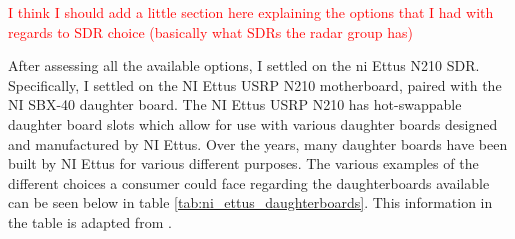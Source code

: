 \documentclass[11pt]{report}
\begin{document}
\textcolor{red}{I think I should add a little section here explaining the options that I had with regards to SDR choice (basically what SDRs the radar group has)}

After assessing all the available options, I settled on the \gls{ni} Ettus N210 SDR. Specifically, I settled on the NI Ettus USRP N210 motherboard, paired with the NI SBX-40 daughter board. The NI Ettus USRP N210 has hot-swappable daughter board slots which allow for use with various daughter boards designed and manufactured by NI Ettus. Over the years, many daughter boards have been built by NI Ettus for various different purposes. The various examples of the different choices a consumer could face regarding the daughterboards available can be seen below in table \ref{tab:ni_ettus_daughterboards}. This information in the table is adapted from \cite{Addressing_Next_generation_Wireless_Challenges_with_Commercial_Software_defined_Radio_Platforms}.
\end{document}
